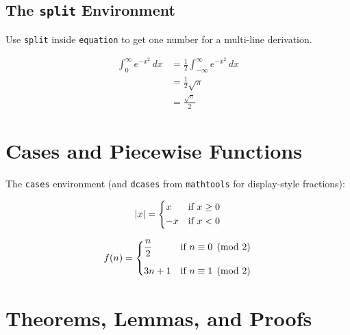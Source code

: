 \documentclass[12pt]{article}
\theoremstyle{plain}
\theoremstyle{definition}
\theoremstyle{remark}
\begin{document}
\subsection{The \texttt{split} Environment}

Use \texttt{split} inside \texttt{equation} to get one number for a multi-line
derivation.

\begin{equation}
\begin{split}
    \int_0^\infty e^{-x^2}\,dx
        &= \frac{1}{2}\int_{-\infty}^{\infty} e^{-x^2}\,dx \\
        &= \frac{1}{2}\sqrt{\pi} \\
        &= \frac{\sqrt{\pi}}{2}
\end{split}
\label{eq:gaussian}
\end{equation}

\section{Cases and Piecewise Functions}

The \texttt{cases} environment (and \texttt{dcases} from \texttt{mathtools}
for display-style fractions):

\begin{equation}
    |x| =
    \begin{dcases}
        x  & \text{if } x \ge 0 \\
        -x & \text{if } x < 0
    \end{dcases}
\end{equation}

\begin{equation}
    f(n) =
    \begin{dcases}
        \frac{n}{2}   & \text{if } n \equiv 0 \pmod{2} \\[6pt]
        3n + 1         & \text{if } n \equiv 1 \pmod{2}
    \end{dcases}
\end{equation}

\section{Theorems, Lemmas, and Proofs}
\end{document}
